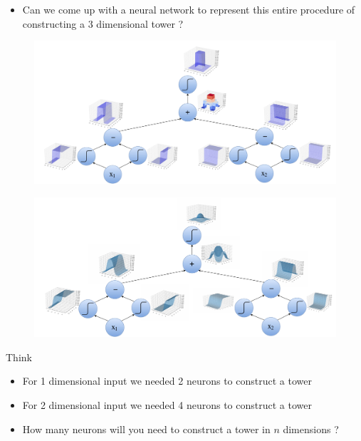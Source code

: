 \begin{frame}
	\begin{itemize}\justifying
		\item Can we come up with a neural network to represent this entire procedure of constructing a 3 dimensional tower ?
	\end{itemize}
\end{frame}

\begin{frame}
	\begin{figure}
		\includegraphics[scale=0.3]{images/module5/Plots/nn_step}
	\end{figure}
\end{frame}

\begin{frame}
	\begin{figure}
		\includegraphics[scale=0.3]{images/module5/Plots/nn_g}
	\end{figure}
\end{frame}


\begin{frame}
	\begin{block}{Think}
		\begin{itemize}\justifying
			\item For 1 dimensional input we needed 2 neurons to construct a tower
			\item For 2 dimensional input we needed 4 neurons to construct a tower
			\item How many neurons will you need to construct a tower in $n$ dimensions ?
		\end{itemize}
	\end{block}
\end{frame}


